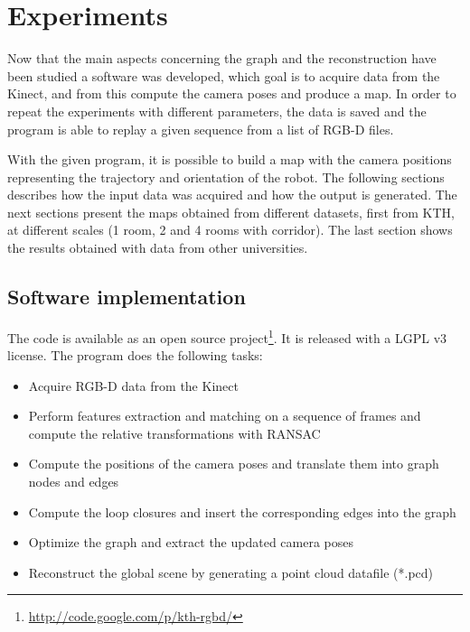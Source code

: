 \chapter{Experiments}
\label{chap:experiments}

Now that the main aspects concerning the graph and the reconstruction have been studied a software was developed, which goal is to acquire data from the Kinect, and from this compute the camera poses and produce a map. In order to repeat the experiments with different parameters, the data is saved and the program is able to replay a given sequence from a list of RGB-D files.

With the given program, it is possible to build a map with the camera positions representing the trajectory and orientation of the robot. The following sections describes how the input data was acquired and how the output is generated. The next sections present the maps obtained from different datasets, first from \gls{KTH}, at different scales (1 room, 2 and 4 rooms with corridor). The last section shows the results obtained with data from other universities. 

\section{Software implementation}

The code is available as an open source project\footnote{\url{http://code.google.com/p/kth-rgbd/}}. It is released with a LGPL v3 license.
The program does the following tasks:
\begin{itemize}
\item Acquire RGB-D data from the Kinect
\item Perform features extraction and matching on a sequence of frames and compute the relative transformations with \gls{RANSAC}
\item Compute the positions of the camera poses and translate them into graph nodes and edges
\item Compute the loop closures and insert the corresponding edges into the graph
\item Optimize the graph and extract the updated camera poses
\item Reconstruct the global scene by generating a point cloud datafile (*.pcd)
\end{itemize}


